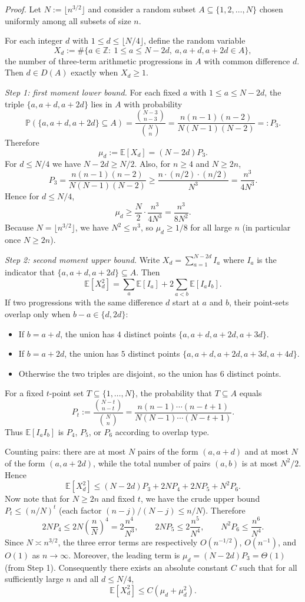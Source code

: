 \smallskip
\noindent\emph{Proof.}
Let $N:=\lfloor n^{3/2}\rfloor$ and consider a random subset $A\subseteq\{1,2,\dots,N\}$ chosen uniformly among all subsets of size $n$.

For each integer $d$ with $1\le d\le \lfloor N/4\rfloor$, define the random variable
\[
X_d := \#\{a\in\mathbb{Z}:\ 1\le a\le N-2d,\ a,a+d,a+2d\in A\},
\]
the number of three-term arithmetic progressions in $A$ with common difference $d$.
Then $d\in D(A)$ exactly when $X_d\ge 1$.

\smallskip
\noindent
\emph{Step 1: first moment lower bound.}
For each fixed $a$ with $1\le a\le N-2d$, the triple $\{a,a+d,a+2d\}$ lies in $A$ with probability
\[
\mathbb{P}(\{a,a+d,a+2d\}\subseteq A)=\frac{\binom{N-3}{n-3}}{\binom{N}{n}}=\frac{n(n-1)(n-2)}{N(N-1)(N-2)}=:P_3.
\]
Therefore
\[
\mu_d:=\mathbb{E}[X_d]=(N-2d)P_3.
\]
For $d\le N/4$ we have $N-2d\ge N/2$. Also, for $n\ge 4$ and $N\ge 2n$,
\[
P_3=\frac{n(n-1)(n-2)}{N(N-1)(N-2)}\ge \frac{n\cdot (n/2)\cdot (n/2)}{N^3}=\frac{n^3}{4N^3}.
\]
Hence for $d\le N/4$,
\[
\mu_d\ge \frac{N}{2}\cdot \frac{n^3}{4N^3}=\frac{n^3}{8N^2}.
\]
Because $N=\lfloor n^{3/2}\rfloor$, we have $N^2\le n^3$, so $\mu_d\ge 1/8$ for all large $n$ (in particular once $N\ge 2n$).

\smallskip
\noindent
\emph{Step 2: second moment upper bound.}
Write $X_d=\sum_{a=1}^{N-2d} I_a$ where $I_a$ is the indicator that $\{a,a+d,a+2d\}\subseteq A$.
Then
\[
\mathbb{E}[X_d^2]=\sum_a \mathbb{E}[I_a] + 2\sum_{a<b}\mathbb{E}[I_a I_b].
\]
If two progressions with the same difference $d$ start at $a$ and $b$, their point-sets overlap only when $b-a\in\{d,2d\}$:
\begin{itemize}
\item If $b=a+d$, the union has $4$ distinct points $\{a,a+d,a+2d,a+3d\}$.
\item If $b=a+2d$, the union has $5$ distinct points $\{a,a+d,a+2d,a+3d,a+4d\}$.
\item Otherwise the two triples are disjoint, so the union has $6$ distinct points.
\end{itemize}
For a fixed $t$-point set $T\subseteq\{1,\dots,N\}$, the probability that $T\subseteq A$ equals
\[
P_t:=\frac{\binom{N-t}{n-t}}{\binom{N}{n}}=\frac{n(n-1)\cdots (n-t+1)}{N(N-1)\cdots (N-t+1)}.
\]
Thus $\mathbb{E}[I_a I_b]$ is $P_4$, $P_5$, or $P_6$ according to overlap type.

Counting pairs: there are at most $N$ pairs of the form $(a,a+d)$ and at most $N$ of the form $(a,a+2d)$, while the total number of pairs $(a,b)$ is at most $N^2/2$. Hence
\[
\mathbb{E}[X_d^2]\le (N-2d)P_3 + 2N P_4 + 2N P_5 + N^2 P_6.
\]
Now note that for $N\ge 2n$ and fixed $t$, we have the crude upper bound $P_t\le (n/N)^t$ (each factor $(n-j)/(N-j)\le n/N$). Therefore
\[
2N P_4 \le 2N\left(\frac{n}{N}\right)^4=2\frac{n^4}{N^3},\qquad
2N P_5 \le 2\frac{n^5}{N^4},\qquad
N^2 P_6\le \frac{n^6}{N^4}.
\]
Since $N\asymp n^{3/2}$, the three error terms are respectively $O(n^{-1/2})$, $O(n^{-1})$, and $O(1)$ as $n\to\infty$.
Moreover, the leading term is $\mu_d=(N-2d)P_3=\Theta(1)$ (from Step 1). Consequently there exists an absolute constant $C$ such that for all sufficiently large $n$ and all $d\le N/4$,
\[
\mathbb{E}[X_d^2]\le C(\mu_d+\mu_d^2).
\]


